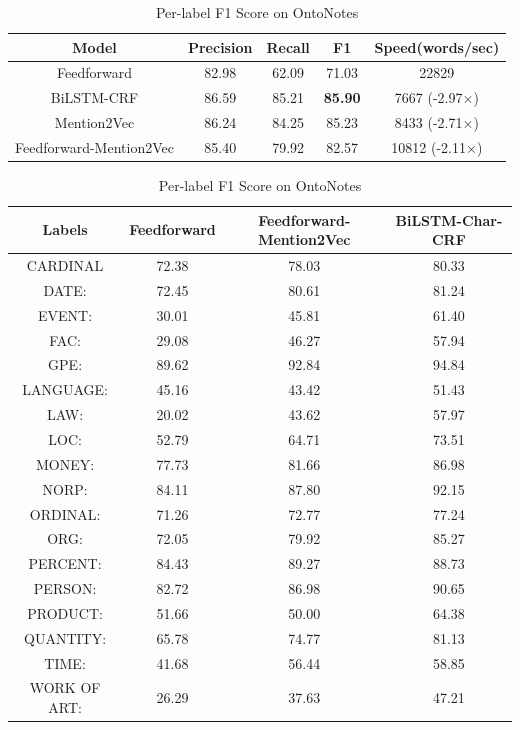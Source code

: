 \begin{table}[h]
\centering
\caption{NER F1 Score and Decoding Speed Comparison on OntoNotes}
\label{table:ner-mention2vec2}
\begin{tabular}{|c|c|c|c|c|}
\hline
Model & Precision & Recall & F1 & Speed(words/sec) \\ \hline
Feedforward  & 82.98 & 62.09 & 71.03 & 22829 \\ \hline
BiLSTM-CRF &86.59 &85.21 &\textbf{85.90} & 7667 (-2.97$\times$)
  \\ \hline
Mention2Vec & 86.24 & 84.25 & 85.23 & 8433 (-2.71$\times$)
         \\ \hline
Feedforward-Mention2Vec & 85.40 & 79.92 & 82.57 & 10812 (-2.11$\times$) \\ \hline
\end{tabular}
\bigskip
\caption{Per-label F1 Score on OntoNotes}
\label{table:ner-mention2vec3}
\begin{tabular}{|c|c|c|c|}
\hline
Labels             & Feedforward & Feedforward-Mention2Vec & BiLSTM-Char-CRF \\ \hline
         CARDINAL  & 72.38  & 78.03  & 80.33 \\ \hline
             DATE: & 72.45  & 80.61  & 81.24 \\ \hline
            EVENT: & 30.01  & 45.81  & 61.40 \\ \hline
              FAC: & 29.08  & 46.27  & 57.94 \\ \hline
              GPE: & 89.62  & 92.84  & 94.84 \\ \hline
         LANGUAGE: & 45.16  & 43.42  & 51.43 \\ \hline
              LAW: & 20.02  & 43.62  & 57.97 \\ \hline
              LOC: & 52.79  & 64.71  & 73.51 \\ \hline
            MONEY: & 77.73  & 81.66  & 86.98 \\ \hline
             NORP: & 84.11  & 87.80  & 92.15 \\ \hline
          ORDINAL: & 71.26  & 72.77  & 77.24 \\ \hline
              ORG: & 72.05  & 79.92  & 85.27 \\ \hline
          PERCENT: & 84.43  & 89.27  & 88.73 \\ \hline
           PERSON: & 82.72  & 86.98  & 90.65 \\ \hline
          PRODUCT: & 51.66  & 50.00  & 64.38 \\ \hline
         QUANTITY: & 65.78  & 74.77  & 81.13 \\ \hline
             TIME: & 41.68  & 56.44  & 58.85 \\ \hline
      WORK OF ART: & 26.29  & 37.63  & 47.21 \\ \hline
\end{tabular}
\end{table}



